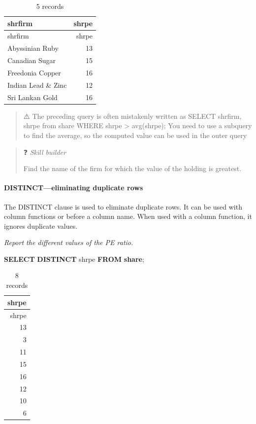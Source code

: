 \documentclass[
]{article}
\newenvironment{Shaded}{\begin{snugshade}}{\end{snugshade}}
\newcommand{\KeywordTok}[1]{\textcolor[rgb]{0.13,0.29,0.53}{\textbf{#1}}}
\newcommand{\NormalTok}[1]{#1}
\begin{document}
\begin{longtable}[]{@{}lr@{}}
\caption{5 records}\tabularnewline
\toprule()
shrfirm & shrpe \\
\midrule()
\endfirsthead
\toprule()
shrfirm & shrpe \\
\midrule()
\endhead
Abyssinian Ruby & 13 \\
Canadian Sugar & 15 \\
Freedonia Copper & 16 \\
Indian Lead \& Zinc & 12 \\
Sri Lankan Gold & 16 \\
\bottomrule()
\end{longtable}

\begin{quote}
⚠️ The preceding query is often mistakenly written as SELECT shrfirm,
shrpe from share WHERE shrpe \textgreater{} avg(shrpe); You need to use
a subquery to find the average, so the computed value can be used in the
outer query
\end{quote}

\begin{quote}
❓ \emph{Skill builder}

Find the name of the firm for which the value of the holding is
greatest.
\end{quote}

\hypertarget{distincteliminating-duplicate-rows}{%
\paragraph{DISTINCT---eliminating duplicate
rows}\label{distincteliminating-duplicate-rows}}

The DISTINCT clause is used to eliminate duplicate rows. It can be used
with column functions or before a column name. When used with a column
function, it ignores duplicate values.

\emph{Report the different values of the PE ratio.}

\begin{Shaded}
\begin{Highlighting}[]
\KeywordTok{SELECT} \KeywordTok{DISTINCT}\NormalTok{ shrpe }\KeywordTok{FROM} \KeywordTok{share}\NormalTok{;}
\end{Highlighting}
\end{Shaded}

\begin{longtable}[]{@{}r@{}}
\caption{8 records}\tabularnewline
\toprule()
shrpe \\
\midrule()
\endfirsthead
\toprule()
shrpe \\
\midrule()
\endhead
13 \\
3 \\
11 \\
15 \\
16 \\
12 \\
10 \\
6 \\
\bottomrule()
\end{longtable}
\end{document}
